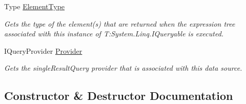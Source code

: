 \begin{DoxyCompactItemize}
Type \hyperlink{classCqrs_1_1Azure_1_1DocumentDb_1_1DataStores_1_1AzureDocumentDbDataStore_a6c007c12b342eeeb936ba748e5391bc3}{Element\+Type}
\begin{DoxyCompactList}\small\item\em Gets the type of the element(s) that are returned when the expression tree associated with this instance of T\+:\+System.\+Linq.\+I\+Queryable is executed. \end{DoxyCompactList}\item 
I\+Query\+Provider \hyperlink{classCqrs_1_1Azure_1_1DocumentDb_1_1DataStores_1_1AzureDocumentDbDataStore_ac7beb3868691d1cba378fa58e3f0e999}{Provider}
\begin{DoxyCompactList}\small\item\em Gets the single\+Result\+Query provider that is associated with this data source. \end{DoxyCompactList}\end{DoxyCompactItemize}


\subsection{Constructor \& Destructor Documentation}
\mbox{\label{classCqrs_1_1Azure_1_1DocumentDb_1_1DataStores_1_1AzureDocumentDbDataStore_add3f66df634a9e9ca0cbd4498e4478f6}} 
